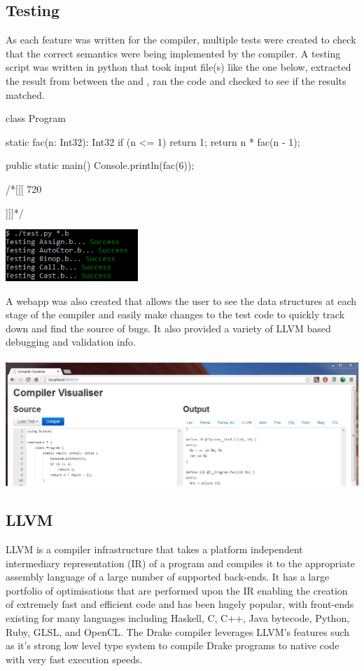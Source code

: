 \documentclass{article}
\newcommand{\bt}{\ensuremath{^{\backprime}}}
\newcommand{\code}[1]{\texttt{\StrSubstitute{#1}{`}{\bt}}}
\newcommand{\bcode}[1]{\code{#1}}
\newcommand{\plname}[0]{Drake\xspace}
\begin{document}
\subsection{Testing}
As each feature was written for the compiler, multiple tests were created to check that the correct semantics were being implemented by the compiler. A testing script was written in python that took input file(s) like the one below, extracted the result from between the \bcode{/*[[[} and \bcode{]]]*/}, ran the code and checked to see if the results matched.
\\
\begin{minipage}{0.6\textwidth}
\begin{sooplisting}
class Program {
	static fac(n: Int32): Int32 {
		if (n <= 1)
			return 1;
		return n * fac(n - 1);
	}

	public static main() {
		Console.println(fac(6));
	}
}

/*[[[
720

]]]*/
\end{sooplisting}
\end{minipage}
\begin{minipage}{0.4\textwidth}
\includegraphics[width=5cm]{test_run}
\end{minipage}
A webapp was also created that allows the user to see the data structures at each stage of the compiler and easily make changes to the test code to quickly track down and find the source of bugs. It also provided a variety of LLVM based debugging and validation info.
\\\\
\includegraphics[width=\textwidth]{webapp}

\subsection{LLVM}
LLVM is a compiler infrastructure that takes a platform independent intermediary representation (IR) of a program and compiles it to the appropriate assembly language of a large number of supported back-ends. It has a large portfolio of optimisations that are performed upon the IR enabling the creation of extremely fast and efficient code and has been hugely popular, with front-ends existing for many languages including Haskell, C, C++, Java bytecode, Python, Ruby, GLSL, and OpenCL. The \plname compiler leverages LLVM's features such as it's strong low level type system to compile \plname{} programs to native code with very fast execution speeds.
\end{document}

